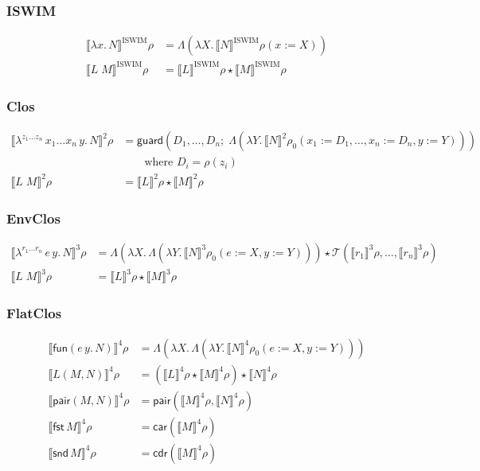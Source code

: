 \documentclass[10pt]{article}
\theoremstyle{acmplain}
\newcommand{\SEM}[1]{\llbracket #1 \rrbracket}
\newcommand{\key}[1]{\mathsf{#1}}
\newcommand{\lam}[1]{\lambda #1.\,}
\newcommand{\clos}[2]{\lambda^{#1}\, #2.\,}
\newcommand{\fun}[1]{\key{fun}(#1)}
\newcommand{\pair}[2]{\key{pair}(#1, #2)}
\newcommand{\FST}{\key{fst}\,}
\newcommand{\SND}{\key{snd}\,}
\newcommand{\ext}[3]{#1(#2{:=}#3)}
\newcommand{\app}{\star}
\begin{document}
\subsubsection{ISWIM}

\begin{align*}
  \SEM{\lam{x} N}^{\mathrm{ISWIM}}\rho &= \Lambda(\lambda X.\, \SEM{N}^{\mathrm{ISWIM}}\ext{\rho}{x}{X}) \\
  \SEM{L\;M}^{\mathrm{ISWIM}}\rho &= \SEM{L}^{\mathrm{ISWIM}}\rho \app \SEM{M}^{\mathrm{ISWIM}}\rho
\end{align*}

\subsubsection{Clos}

\begin{align*}
  \SEM{\clos{z_1\ldots z_n}{x_1\ldots x_n\, y} N}^{\mathrm{2}}\rho &=
    \key{guard}(D_1, \ldots, D_n;\;
       \Lambda(\lambda Y.\, \SEM{N}^{\mathrm{2}}\rho_0(x_1{:=}D_1,\ldots,x_n{:=}D_n, y{:=}Y)))
    \\ &\qquad\text{where } D_i = \rho(z_i) \\
  \SEM{L\;M}^{\mathrm{2}}\rho &= \SEM{L}^{\mathrm{2}}\rho \app \SEM{M}^{\mathrm{2}}\rho
\end{align*}

\subsubsection{EnvClos}

\begin{align*}
  \SEM{\clos{r_1\ldots r_n}{e\, y} N}^{\mathrm{3}}\rho &=
    \Lambda(\lambda X.\, \Lambda(\lambda Y.\, \SEM{N}^{\mathrm{3}}\rho_0(e{:=}X, y{:=}Y)))
    \app \mathcal{T}(\SEM{r_1}^{\mathrm{3}}\rho, \ldots, \SEM{r_n}^{\mathrm{3}}\rho) \\
  \SEM{L\;M}^{\mathrm{3}}\rho &= \SEM{L}^{\mathrm{3}}\rho \app \SEM{M}^{\mathrm{3}}\rho
\end{align*}

\subsubsection{FlatClos}

\begin{align*}
  \SEM{\fun{e\,y.\,N}}^{\mathrm{4}}\rho &= \Lambda(\lambda X.\, \Lambda(\lambda Y.\, \SEM{N}^{\mathrm{4}}\rho_0(e{:=}X, y{:=}Y))) \\
  \SEM{L(M, N)}^{\mathrm{4}}\rho &= (\SEM{L}^{\mathrm{4}}\rho \app \SEM{M}^{\mathrm{4}}\rho) \app \SEM{N}^{\mathrm{4}}\rho \\
  \SEM{\pair{M}{N}}^{\mathrm{4}}\rho &= \key{pair}(\SEM{M}^{\mathrm{4}}\rho, \SEM{N}^{\mathrm{4}}\rho) \\
  \SEM{\FST M}^{\mathrm{4}}\rho &= \key{car}(\SEM{M}^{\mathrm{4}}\rho) \\
  \SEM{\SND M}^{\mathrm{4}}\rho &= \key{cdr}(\SEM{M}^{\mathrm{4}}\rho)
\end{align*}
\end{document}
